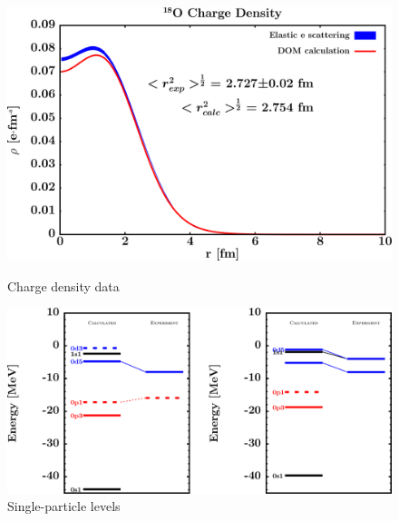 \afterpage{\clearpage}

\begin{figure}[H]
    \centering
    \begin{minipage}{0.45\textwidth}
        \centering
        \includegraphics[width=1.0\textwidth]{figures/o18_chargeDensity.png}
        \caption{Charge density data}
        \label{DOMFitData_o18_chargeDensity}
    \end{minipage}\hfill
    \begin{minipage}{0.45\textwidth}
        \centering
        \includegraphics[width=1.0\textwidth]{figures/o18_SPLevels.png}
        \caption{Single-particle levels}
        \label{DOMFitData_o18_SPLevels}
    \end{minipage}
\end{figure}

\afterpage{\clearpage}

